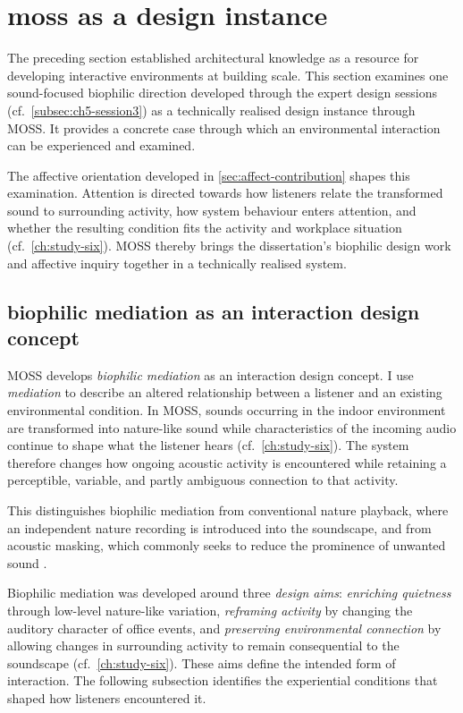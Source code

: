 \section{moss as a design instance}
\label{sec:sound-instance}

The preceding section established architectural knowledge as a resource for developing interactive environments at building scale. This section examines one sound-focused biophilic direction developed through the expert design sessions (cf.~\autoref{subsec:ch5-session3}) as a technically realised design instance through MOSS. It provides a concrete case through which an environmental interaction can be experienced and examined.

The affective orientation \cite{boehner2005affect,boehner2007emotion} developed in \autoref{sec:affect-contribution} shapes this examination. Attention is directed towards how listeners relate the transformed sound to surrounding activity, how system behaviour enters attention, and whether the resulting condition fits the activity and workplace situation (cf.~\autoref{ch:study-six}).  MOSS thereby brings the dissertation's biophilic design work and affective inquiry together in a technically realised system.


\subsection{biophilic mediation as an interaction design concept}
\label{subsec:biophilic-mediation}

MOSS develops \emph{biophilic mediation} as an interaction design
concept. I use \emph{mediation} to describe an altered relationship
between a listener and an existing environmental condition. In MOSS,
sounds occurring in the indoor environment are transformed into
nature-like sound while characteristics of the incoming audio continue
to shape what the listener hears (cf.~\autoref{ch:study-six}). The system therefore changes how ongoing acoustic activity is encountered while retaining a perceptible, variable, and partly ambiguous connection to that activity.

This distinguishes biophilic mediation from conventional nature
playback, where an independent nature recording is introduced into the
soundscape, and from acoustic masking, which commonly seeks to reduce
the prominence of unwanted sound \cite{haas2018soundscape, jacobsen2024personal}.

Biophilic mediation was developed around three \emph{design aims}:
\emph{enriching quietness} through low-level nature-like variation,
\emph{reframing activity} by changing the auditory character of office
events, and \emph{preserving environmental connection} by allowing
changes in surrounding activity to remain consequential to the
soundscape
(cf.~\autoref{ch:study-six}). These aims define the intended form of
interaction. The following subsection identifies the experiential
conditions that shaped how listeners encountered it.


